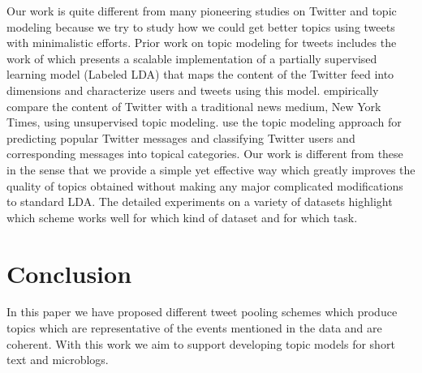 \documentclass[10pt,a5paper,twoside]{article}
\begin{document}

Our work is quite different from many pioneering studies on Twitter and topic modeling because we try to study how we could get better topics using tweets with minimalistic efforts. Prior work on topic modeling for tweets includes the work of \cite{ramage} which presents a scalable implementation of a partially supervised learning model (Labeled LDA) that maps the content of the Twitter feed into dimensions and characterize users and tweets using this model. \cite{wayne} empirically compare the content of Twitter with a traditional news medium, New York Times, using unsupervised topic modeling. \cite{hong} use the topic modeling approach for predicting popular Twitter messages and classifying Twitter users and corresponding messages into topical categories. Our work is different from these in the sense that we provide a simple yet effective way which greatly improves the quality of topics obtained without making any major complicated modifications to standard LDA. The detailed experiments on a variety of datasets highlight which scheme works well for which kind of dataset and for which task.
\\

\section{Conclusion}
In this paper we have proposed different tweet pooling schemes which produce topics which are representative of the events mentioned in the data and are coherent. With this work we aim to support%
developing topic models for short text and microblogs. %
\end{document}
